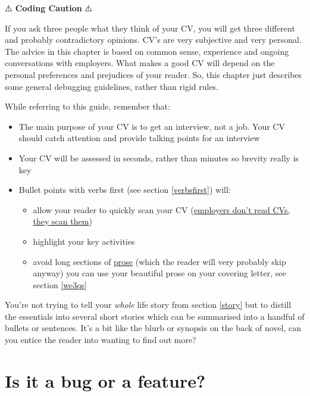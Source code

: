 \documentclass[
]{book}
\providecommand{\tightlist}{%
  \setlength{\itemsep}{0pt}\setlength{\parskip}{0pt}}
\begin{document}
⚠️ \textbf{Coding Caution} ⚠️

If you ask three people what they think of your CV, you will get three different and probably contradictory opinions. CV's are very subjective and very personal. The advice in this chapter is based on common sense, experience and ongoing conversations with employers. What makes a good CV will depend on the personal preferences and prejudices of your reader. So, this chapter just describes some general debugging guidelines, rather than rigid rules.

While referring to this guide, remember that:

\begin{itemize}
\tightlist
\item
  The main purpose of your CV is to get an interview, not a job. Your CV should catch attention and provide talking points for an interview
\item
  Your CV will be assessed in seconds, rather than minutes so brevity really is key
\item
  Bullet points with verbs first (see section \ref{verbsfirst}) will:

  \begin{itemize}
  \tightlist
  \item
    allow your reader to quickly scan your CV (\href{https://readabilityguidelines.co.uk/content-design/how-people-read/}{employers don't read CVs, they scan them}) \citep{scanning}
  \item
    highlight your key activities
  \item
    avoid long sections of \href{https://en.wikipedia.org/wiki/Prose}{prose} (which the reader will very probably skip anyway) you can use your beautiful prose on your covering letter, see section \ref{we3qs}
  \end{itemize}
\end{itemize}

You're not trying to tell your \emph{whole} life story from section \ref{story} but to distill the essentials into several short stories which can be summarised into a handful of bullets or sentences. It's a bit like the blurb or synopsis on the back of novel, can you entice the reader into wanting to find out more?

\hypertarget{mycv}{%
\section{Is it a bug or a feature?}\label{mycv}}
\end{document}

